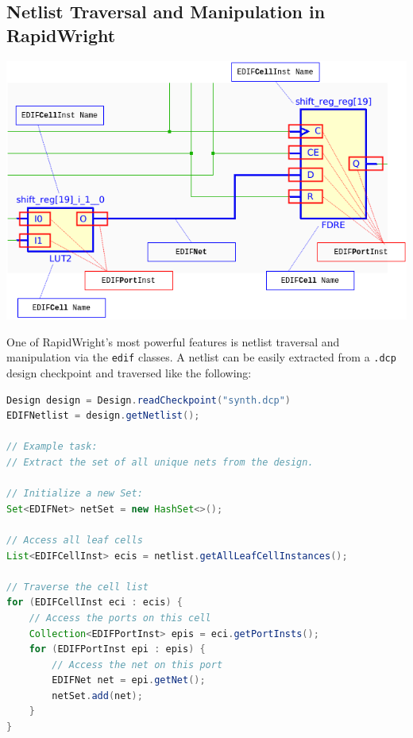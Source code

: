 \begin{multicols}{2}

\subsection{Netlist Traversal and Manipulation in RapidWright}

{
    \centering
    \includegraphics[valign=c, width=\columnwidth]{figures/traversal.png}
    \label{fig:traversal}
}
\vspace{0.5cm}


One of RapidWright's most powerful features is netlist traversal and manipulation via the \texttt{edif} classes. A netlist can be easily extracted from a \texttt{.dcp} design checkpoint and traversed like the following: 

\begin{lstlisting}[language=java, caption={Netlist extraction and traversal}, label={lst:netlist_extract}]
Design design = Design.readCheckpoint("synth.dcp")
EDIFNetlist = design.getNetlist();

// Example task:
// Extract the set of all unique nets from the design.

// Initialize a new Set:
Set<EDIFNet> netSet = new HashSet<>();

// Access all leaf cells
List<EDIFCellInst> ecis = netlist.getAllLeafCellInstances();

// Traverse the cell list
for (EDIFCellInst eci : ecis) {
    // Access the ports on this cell
    Collection<EDIFPortInst> epis = eci.getPortInsts();
    for (EDIFPortInst epi : epis) {
        // Access the net on this port
        EDIFNet net = epi.getNet();
        netSet.add(net);
    }
}


\end{lstlisting}
\end{multicols}
